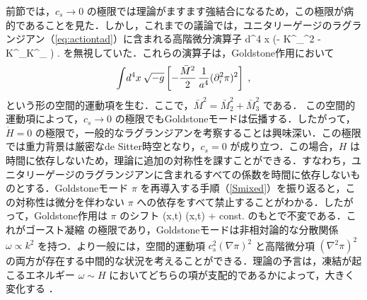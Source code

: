 
前節では，$c_s \to 0$ の極限では理論がますます強結合になるため，この極限が病的であることを見た．しかし，これまでの議論では，ユニタリーゲージのラグランジアン（\ref{eq:actiontad}）に含まれる高階微分演算子
\be
\int d^4 x  \left(- \delta K^\mu {}_\mu {}^2
- \delta K^\mu {}_\nu \delta K^\nu {}_\mu
\right) \;.
\ee
を無視していた．これらの演算子は，Goldstone作用において
\begin{equation}
\label{di_pi2}  \int  \! d^4x \: \sqrt{-g} \left[ - \frac{\bar M^2}{2} \, \frac{1}{a^4}(\partial_i^2 \pi)^2
   \right] \; ,
\end{equation}
という形の空間的運動項を生む．ここで，$\bar M^2 = \bar M_2^2+  \bar M_3^2$ である．
この空間的運動項によって，$c_s \to 0$ の極限でもGoldstoneモードは伝播する．したがって，$\dot H = 0$ の極限で，一般的なラグランジアンを考察することは興味深い．この極限では重力背景は厳密なde Sitter時空となり，$c_s=0$ が成り立つ．この場合，$H$ は時間に依存しないため，理論に追加の対称性を課すことができる．すなわち，ユニタリーゲージのラグランジアンに含まれるすべての係数を時間に依存しないものとする．Goldstoneモード $\pi$ を再導入する手順（\ref{Smixed}）を振り返ると，この対称性は微分を伴わない $\pi$ への依存をすべて禁止することがわかる．したがって，Goldstone作用は $\pi$ のシフト
\be
\pi(\vec x,t) \to \pi(\vec x,t) + {\rm const.}
\ee
のもとで不変である．これがゴースト凝縮 \cite{Arkani-Hamed:2003pdi} の極限であり，Goldstoneモードは非相対論的な分散関係 $\omega \propto k^2$ を持つ．より一般には，空間的運動項 $c_s^2
(\nabla\pi)^2$ と高階微分項 $(\nabla^2\pi)^2$ の両方が存在する中間的な状況を考えることができる．理論の予言は，凍結が起こるエネルギー $\omega
\sim H$ においてどちらの項が支配的であるかによって，大きく変化する \cite{Arkani-Hamed:2003juy,Senatore:2004rj}．

